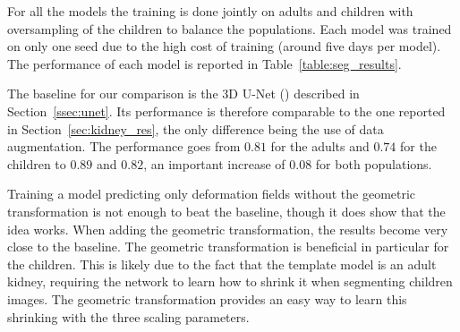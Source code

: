 For all the models the training is done jointly on adults and children with oversampling of the children to balance the populations. Each model was trained on only one seed due to the high cost of training (around five days per model). The performance of each model is reported in Table~\ref{table:seg_results}.

The baseline for our comparison is the 3D U-Net (\textcite{cicek2016MICCAI}) described in Section~\ref{ssec:unet}. Its performance is therefore comparable to the one reported in Section~\ref{sec:kidney_res}, the only difference being the use of data augmentation. The performance goes from $0.81$ for the adults and $0.74$ for the children to $0.89$ and $0.82$, an important increase of $0.08$ for both populations. 

Training a model predicting only deformation fields without the geometric transformation is not enough to beat the baseline, though it does show that the idea works. When adding the geometric transformation, the results become very close to the baseline. The geometric transformation is beneficial in particular for the children. This is likely due to the fact that the template model is an adult kidney, requiring the network to learn how to shrink it when segmenting children images. The geometric transformation provides an easy way to learn this shrinking with the three scaling parameters.



